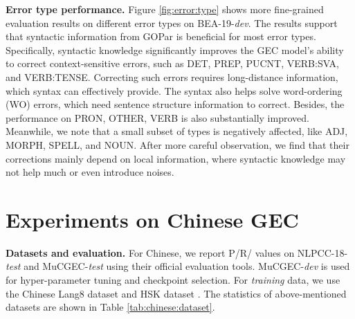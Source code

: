 \documentclass[11pt]{article}
\begin{document}
\textbf{Error type performance.} Figure \ref{fig:error:type} shows more fine-grained evaluation results on different error types on BEA-19-\textit{dev}.
The results support that syntactic information from GOPar is beneficial for most error types. Specifically, syntactic knowledge significantly improves the GEC model's ability to correct context-sensitive errors, such as DET, PREP, PUCNT, VERB:SVA, and VERB:TENSE. Correcting such errors requires long-distance information, which syntax can effectively provide. The syntax also helps solve word-ordering (WO) errors, which need sentence structure information to correct. Besides, the performance on PRON, OTHER, VERB is also substantially improved. Meanwhile, we note that a small subset of types is negatively affected, like ADJ, MORPH, SPELL, and NOUN. After more careful observation, we find that their corrections mainly depend on local information, where syntactic knowledge may not help much or even introduce noises.

 
\section{Experiments on Chinese GEC}
\label{sec:chinese:exp}




\textbf{Datasets and evaluation.} 
For Chinese, we report P/R/ values on NLPCC-18-\textit{test} \citep{zhao2018overview} and MuCGEC-\emph{test} \cite{zhang2022mucgec} using their official evaluation tools. MuCGEC-\emph{dev} is used for hyper-parameter tuning and checkpoint selection. For \emph{training} data, we use the Chinese Lang8 dataset \citep{zhao2018overview} and HSK dataset \citep{zhang2009hsk}. The statistics of above-mentioned datasets are shown in Table \ref{tab:chinese:dataset}. 
\end{document}
